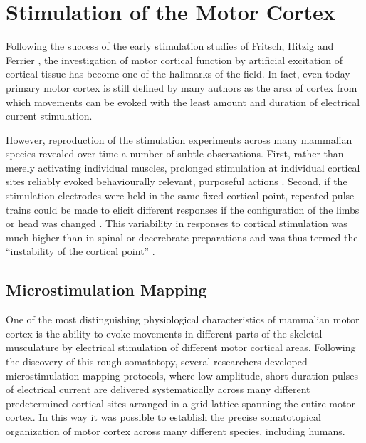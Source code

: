 \section{Stimulation of the Motor Cortex}

Following the success of the early stimulation studies of Fritsch, Hitzig and Ferrier \cite{Fritsch1870,Ferrier1873}, the investigation of motor cortical function by artificial excitation of cortical tissue has become one of the hallmarks of the field. In fact, even today primary motor cortex is still defined by many authors as the area of cortex from which movements can be evoked with the least amount and duration of electrical current stimulation.

However, reproduction of the stimulation experiments across many mammalian species \cite{Ferrier1873,Clark1937} revealed over time a number of subtle observations. First, rather than merely activating individual muscles, prolonged stimulation at individual cortical sites reliably evoked behaviourally relevant, purposeful actions \cite{Ferrier1873,Clark1937}. Second, if the stimulation electrodes were held in the same fixed cortical point, repeated pulse trains could be made to elicit different responses if the configuration of the limbs or head was changed \cite{Ward1938}. This variability in responses to cortical stimulation was much higher than in spinal or decerebrate preparations and was thus termed the ``instability of the cortical point'' \cite{GrahamBrown1912,Leyton1917}.

\subsection{Microstimulation Mapping}

One of the most distinguishing physiological characteristics of mammalian motor cortex is the ability to evoke movements in different parts of the skeletal musculature by electrical stimulation of different motor cortical areas. Following the discovery of this rough somatotopy, several researchers developed microstimulation mapping protocols, where low-amplitude, short duration pulses of electrical current are delivered systematically across many different predetermined cortical sites arranged in a grid lattice spanning the entire motor cortex. In this way it was possible to establish the precise somatotopical organization of motor cortex across many different species, including humans.

